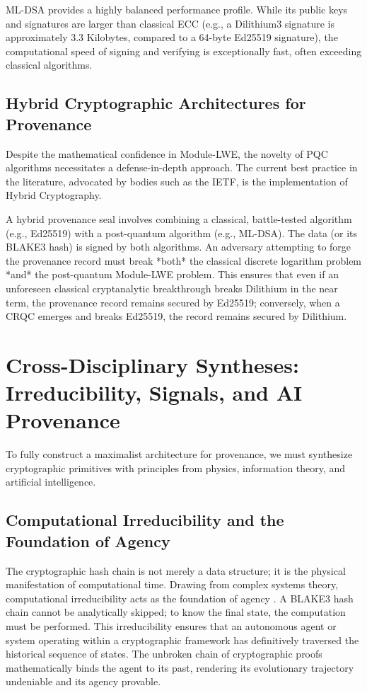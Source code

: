 ML-DSA provides a highly balanced performance profile. While its public keys and signatures are larger than classical ECC (e.g., a Dilithium3 signature is approximately 3.3 Kilobytes, compared to a 64-byte Ed25519 signature), the computational speed of signing and verifying is exceptionally fast, often exceeding classical algorithms. 

\subsection{Hybrid Cryptographic Architectures for Provenance}
Despite the mathematical confidence in Module-LWE, the novelty of PQC algorithms necessitates a defense-in-depth approach. The current best practice in the literature, advocated by bodies such as the IETF, is the implementation of Hybrid Cryptography.

A hybrid provenance seal involves combining a classical, battle-tested algorithm (e.g., Ed25519) with a post-quantum algorithm (e.g., ML-DSA). The data (or its BLAKE3 hash) is signed by both algorithms. An adversary attempting to forge the provenance record must break *both* the classical discrete logarithm problem *and* the post-quantum Module-LWE problem. This ensures that even if an unforeseen classical cryptanalytic breakthrough breaks Dilithium in the near term, the provenance record remains secured by Ed25519; conversely, when a CRQC emerges and breaks Ed25519, the record remains secured by Dilithium.

\section{Cross-Disciplinary Syntheses: Irreducibility, Signals, and AI Provenance}
\label{sec:crypto_prov_synthesis}

To fully construct a maximalist architecture for provenance, we must synthesize cryptographic primitives with principles from physics, information theory, and artificial intelligence. 

\subsection{Computational Irreducibility and the Foundation of Agency}
The cryptographic hash chain is not merely a data structure; it is the physical manifestation of computational time. Drawing from complex systems theory, computational irreducibility acts as the foundation of agency \cite{ref_ComputationalIr9}. A BLAKE3 hash chain cannot be analytically skipped; to know the final state, the computation must be performed. This irreducibility ensures that an autonomous agent or system operating within a cryptographic framework has definitively traversed the historical sequence of states. The unbroken chain of cryptographic proofs mathematically binds the agent to its past, rendering its evolutionary trajectory undeniable and its agency provable.

